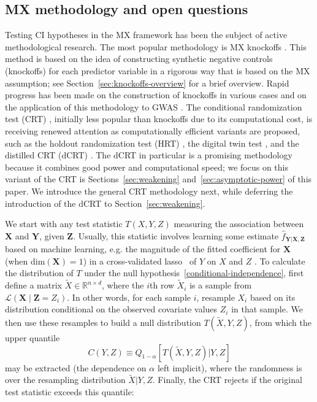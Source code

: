 \documentclass[12pt]{article}
\theoremstyle{definition}
\theoremstyle{remark}
\newcommand{\prx}{\bm X}
\newcommand{\srx}{X}
\newcommand{\prz}{\bm Z}
\newcommand{\srz}{Z}
\newcommand{\srxk}{\widetilde X}
\newcommand{\pry}{{\bm Y}}
\newcommand{\sry}{Y}
\begin{document}
\subsection{MX methodology and open questions}

Testing CI hypotheses in the MX framework has been the subject of active methodological research. The most popular methodology is MX knockoffs \cite{CetL16}. This method is based on the idea of constructing synthetic negative controls (knockoffs) for each predictor variable in a rigorous way that is based on the MX assumption; see Section~\ref{sec:knockoffs-overview} for a brief overview. Rapid progress has been made on the construction of knockoffs in various cases \cite{SetC17,Romano2019a,Bates2019,Huang2019} and on the application of this methodology to GWAS \cite{SetC17, SetS19}. The conditional randomization test (CRT) \cite{CetL16}, initially less popular than knockoffs due to its computational cost, is receiving renewed attention as computationally efficient variants are proposed, such as the holdout randomization test (HRT) \cite{Tansey2018}, the digital twin test \cite{Bates2020}, and the distilled CRT (dCRT) \cite{Liu2020}. The dCRT in particular is a promising methodology because it combines good power and computational speed; we focus on this variant of the CRT is Sections~\ref{sec:weakening} and~\ref{sec:asymptotic-power} of this paper. We introduce the general CRT methodology next, while deferring the introduction of the dCRT to Section~\ref{sec:weakening}. 

We start with any test statistic $T(\srx, \sry, \srz)$ measuring the association between $\prx$ and $\pry$, given $\prz$. Usually, this statistic involves learning some estimate $\widehat f_{\pry|\prx,\prz}$ based on machine learning, e.g. the magnitude of the fitted coefficient for $\prx$ (when $\text{dim}(\prx) = 1$) in a cross-validated lasso~\cite{T96} of $\sry$ on $\srx$ and $\srz$ \cite{CetL16}. To calculate the distribution of $T$ under the null hypothesis~\eqref{conditional-independence}, first define a matrix  $\srxk \in \mathbb R^{n \times d}$, where the $i$th row $\srxk_i$ is a sample from $\mathcal L(\prx \mid \prz = \srz_i)$. In other words, for each sample $i$, resample $\srx_i$ based on its distribution conditional on the observed covariate values $Z_i$ in that sample. We then use these resamples to build a null distribution $T(\srxk, \sry, \srz)$, from which the upper quantile
\begin{equation}
C(\sry,\srz) \equiv Q_{1-\alpha}[T(\srxk, \sry, \srz)|\sry,\srz]
	\label{upper-quantile}
\end{equation}
may be extracted (the dependence on $\alpha$ left implicit), where the randomness is over the resampling distribution $\srxk |  \sry, \srz$. Finally, the CRT rejects if the original test statistic exceeds this quantile:
\end{document}
